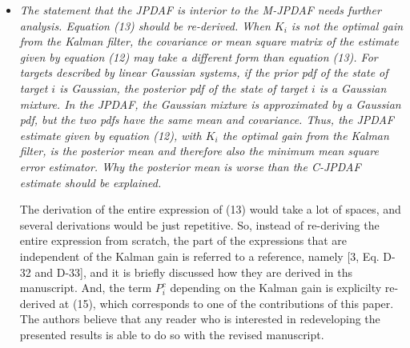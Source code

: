 \documentclass[11pt]{article}
\begin{document}
\begin{itemize}
\item {\itshape The statement that the JPDAF is interior to the M-JPDAF needs further analysis. Equation (13) should be re-derived. When $K_i$ is not the optimal gain from the Kalman filter, the covariance or mean square matrix of the estimate given by equation (12) may take a different form than equation (13). For targets described by linear Gaussian systems, if the prior pdf of the state of target $i$ is Gaussian, the posterior pdf of the state of target $i$ is a Gaussian mixture. In the JPDAF, the Gaussian mixture is approximated by a Gaussian pdf, but the two pdfs have the same mean and covariance. Thus, the JPDAF estimate given by equation (12), with $K_i$ the optimal gain from the Kalman filter, is the posterior mean and therefore also the minimum mean square error estimator. Why the posterior mean is worse than the C-JPDAF estimate should be explained.}


The derivation of the entire expression of (13) would take a lot of spaces, and several derivations would be just repetitive. So, instead of re-deriving the entire expression from scratch, the part of the expressions that are independent of the Kalman gain is referred to a reference, namely [3, Eq. D-32 and D-33], and it is briefly discussed how they are derived in ths manuscript. And, the term $P^c_i$ depending on the Kalman gain is explicilty re-derived at (15), which corresponds to one of the contributions of this paper. The authors believe that any reader who is interested in redeveloping the presented results is able to do so with the revised manuscript. 

%
%
%
%



\end{itemize}
\end{document}
